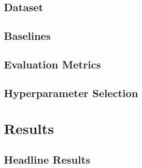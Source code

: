 \documentclass[11pt,a4paper,oneside]{report}
\begin{document}

\section{Dataset}

\section{Baselines}

\section{Evaluation Metrics}

\section{Hyperparameter Selection}

\chapter{Results}
\label{ch:results}


\section{Headline Results}
\end{document}
